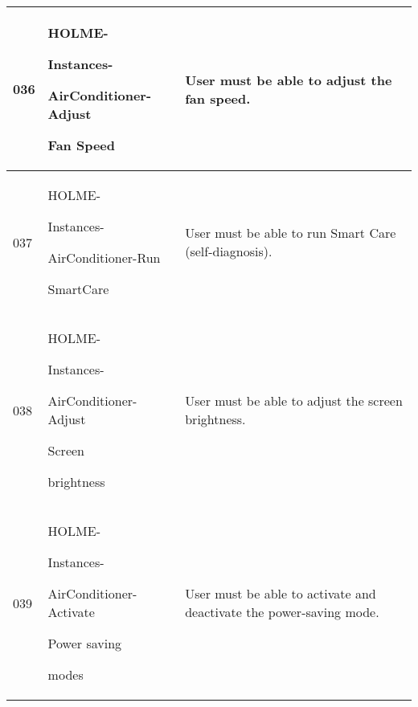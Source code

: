 \documentclass[conference]{IEEEtran}
\begin{document}
\begin{enumerate}
\begin{itemize}
\begin{table}[h]
\begin{tabular}{|p{1cm}|p{1.8cm}|p{5.0cm}|}
         036 \par  & HOLME-\par Instances-\par AirConditioner-Adjust \par Fan Speed & User must be able to adjust the fan speed.\\ \hline
         037 \par  & HOLME-\par Instances-\par AirConditioner-Run \par SmartCare & User must be able to run Smart Care (self-diagnosis).\\ \hline
         038 \par  & HOLME-\par Instances-\par AirConditioner-Adjust \par Screen \par brightness & User must be able to adjust the screen brightness.\\ \hline
         039 \par  & HOLME-\par Instances-\par AirConditioner-Activate \par Power saving \par modes & User must be able to activate and deactivate the power-saving mode.\\ \hline
    \end{tabular}
\end{table}

\vspace{1cm}


\end{itemize}
\end{enumerate}
\end{document}
